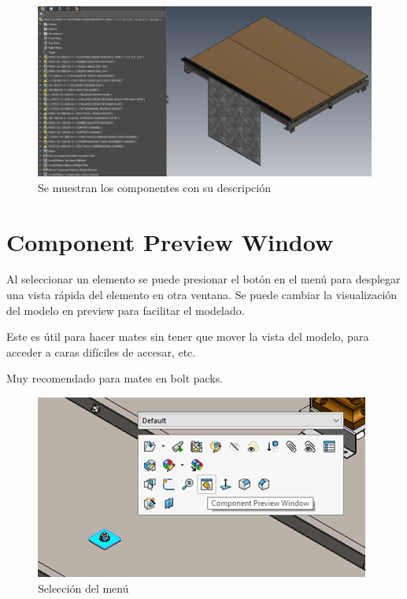 \documentclass{report}
\begin{document}
\begin{figure}[H]
	\centering
	\includegraphics[width=0.85\linewidth, height=0.5\textheight,keepaspectratio]{Imagenes/solidworks_treedisplay03}
	\caption{Se muestran los componentes con su descripción}
	\label{fig:solidworkstreedisplay03}
\end{figure}

\chapter{Component Preview Window}

Al seleccionar un elemento se puede presionar el botón en el menú para desplegar una vista rápida del elemento en otra ventana. Se puede cambiar la visualización del modelo en preview para facilitar el modelado.

Este es útil para hacer mates sin tener que mover la vista del modelo, para acceder a caras difíciles de accesar, etc.

Muy recomendado para mates en bolt packs.

\begin{figure}[H]
	\centering
	\includegraphics[width=0.85\linewidth, height=0.5\textheight,keepaspectratio]{Imagenes/solidworks_componentpreview_01}
	\caption{Selección del menú}
	\label{fig:solidworkscomponentpreview01}
\end{figure}
\end{document}

